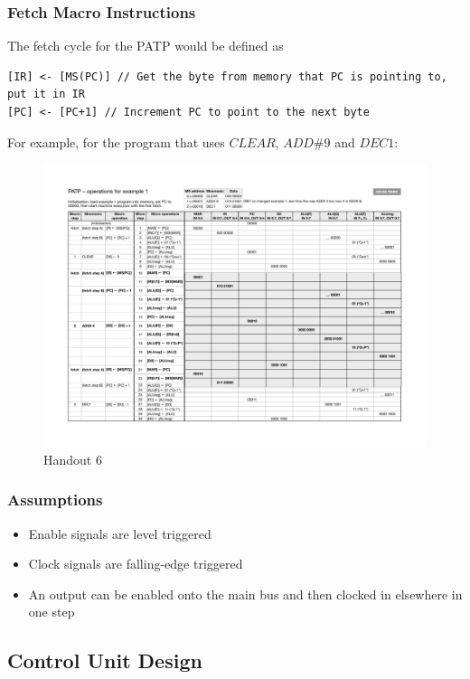 \documentclass[a4paper]{article}
\theoremstyle{plain}
\theoremstyle{definition}
\theoremstyle{remark}
\begin{document}
\subsubsection{Fetch Macro Instructions}
The fetch cycle for the PATP would be defined as
\begin{lstlisting}[language = Code]
[IR] <- [MS(PC)] // Get the byte from memory that PC is pointing to, put it in IR
[PC] <- [PC+1] // Increment PC to point to the next byte
\end{lstlisting}
For example, for the program that uses $CLEAR$, $ADD\# 9$ and $DEC 1$:
\begin{figure}[H]
	\centering
	\includegraphics[width=1\textwidth]{PATP/6.pdf}
	\caption{Handout $6$}
	\label{fig:PATP-6-pdf}
\end{figure}
\subsubsection{Assumptions}
\begin{itemize}
	\item Enable signals are level triggered
	\item Clock signals are falling-edge triggered
	\item An output can be enabled onto the main bus and then clocked in elsewhere in one step
\end{itemize}
\subsection{Control Unit Design}
\end{document}
